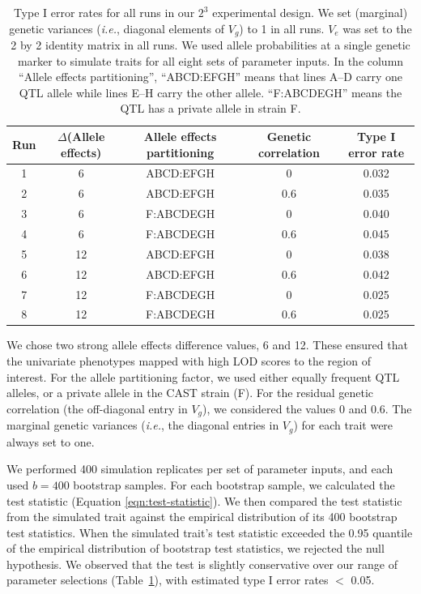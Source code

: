\documentclass[12pt,twoside, lineno]{gsajnl}
\begin{document}
\begin{table}
\begin{center}
  \caption{Type I error rates for all runs in our $2^3$
    experimental design. We set (marginal) genetic variances
    (\emph{i.e.}, diagonal elements of $V_g$) to 1 in all runs. $V_e$
    was set to the 2 by 2 identity matrix in all runs. We used allele
    probabilities at a single genetic marker to simulate traits for
    all eight sets of parameter inputs. In the
    column ``Allele effects partitioning'', ``ABCD:EFGH'' means that lines
    A--D carry one QTL allele while lines E--H carry the other allele.
    ``F:ABCDEGH'' means the QTL has a private allele in strain F.}
  \label{table-typeI}

  \bigskip

\small
  \begin{tabular}{ c | c | c | c | c}
    \hline
    Run & $\Delta$(Allele effects) & Allele effects partitioning & Genetic correlation & Type I error rate \\ \hline
    1 & 6 & ABCD:EFGH & 0 & 0.032\\
    2 & 6 & ABCD:EFGH & 0.6 & 0.035\\
    3 & 6 & F:ABCDEGH & 0 & 0.040\\
    4 & 6 & F:ABCDEGH & 0.6 & 0.045\\
    5 & 12 & ABCD:EFGH & 0 & 0.038\\
    6 & 12 & ABCD:EFGH & 0.6 & 0.042\\
    7 & 12 & F:ABCDEGH & 0 & 0.025\\
    8 & 12 & F:ABCDEGH & 0.6 & 0.025\\
    \hline
  \end{tabular}
\end{center}
  \end{table}

We chose two strong allele effects difference values, 6 and 12. These
ensured that the univariate phenotypes mapped with high LOD scores to
the region of interest. For the allele partitioning factor, we used
either equally frequent QTL alleles, or a private allele in the CAST
strain (F). For the residual genetic correlation (the off-diagonal
entry in $V_g$), we considered the values 0 and 0.6. The marginal
genetic variances (\textit{i.e.}, the diagonal entries in $V_g$) for
each trait were always set to one.

We performed 400 simulation replicates per set of parameter inputs,
and each used $b = 400$ bootstrap samples. For each bootstrap sample, we calculated the
test statistic (Equation \ref{eqn:test-statistic}). We then compared
the test statistic from the simulated trait against the empirical
distribution of its 400 bootstrap test statistics. When the simulated
trait's test statistic exceeded the 0.95 quantile of the empirical
distribution of bootstrap test statistics, we rejected the null
hypothesis. We observed that the test is slightly conservative over
our range of parameter selections (Table~\ref{table-typeI}), with
estimated type I error rates $<$ 0.05.
\end{document}
